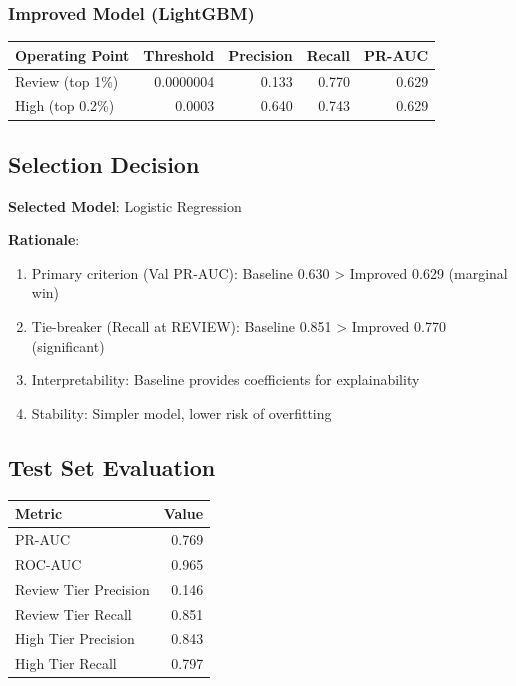 \documentclass[12pt,a4paper]{article}
\begin{document}
\subsubsection{Improved Model (LightGBM)}

\begin{table}[H]
\centering
\begin{tabular}{|p{2.5cm}|r|r|r|r|}
\hline
\textbf{Operating Point} & \textbf{Threshold} & \textbf{Precision} & \textbf{Recall} & \textbf{PR-AUC} \\
\hline
Review (top 1\%) & 0.0000004 & 0.133 & 0.770 & 0.629 \\
High (top 0.2\%) & 0.0003 & 0.640 & 0.743 & 0.629 \\
\hline
\end{tabular}
\end{table}

\subsection{Selection Decision}

\textbf{Selected Model}: Logistic Regression

\textbf{Rationale}:
\begin{enumerate}
    \item Primary criterion (Val PR-AUC): Baseline 0.630 > Improved 0.629 (marginal win)
    \item Tie-breaker (Recall at REVIEW): Baseline 0.851 > Improved 0.770 (significant)
    \item Interpretability: Baseline provides coefficients for explainability
    \item Stability: Simpler model, lower risk of overfitting
\end{enumerate}

\subsection{Test Set Evaluation}

\begin{table}[H]
\centering
\begin{tabular}{|l|r|}
\hline
\textbf{Metric} & \textbf{Value} \\
\hline
PR-AUC & 0.769 \\
ROC-AUC & 0.965 \\
Review Tier Precision & 0.146 \\
Review Tier Recall & 0.851 \\
High Tier Precision & 0.843 \\
High Tier Recall & 0.797 \\
\hline
\end{tabular}
\end{table}
\end{document}
